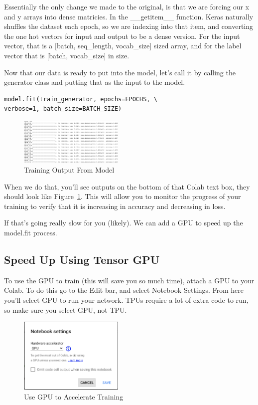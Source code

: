 \documentclass{article}
\begin{document}
Essentially the only change we made to the original, is that we are forcing our x and y arrays into dense matricies. In the \_\_getitem\_\_ function. Keras naturally shuffles the dataset each epoch, so we are indexing into that item, and converting the one hot vectors for input and output to be a dense version. For the input vector, that is a [batch, seq\_length, vocab\_size] sized array, and for the label vector that is [batch, vocab\_size] in size.

Now that our data is ready to put into the model, let's call it by calling the generator class and putting that as the input to the model. 

\begin{verbatim}
model.fit(train_generator, epochs=EPOCHS, \
verbose=1, batch_size=BATCH_SIZE)
\end{verbatim}

\begin{figure}[h!]
\centering
\includegraphics[width=50mm]{TrainingOutput.png}
\caption{Training Output From Model}
\label{fig:train}
\end{figure}

When we do that, you'll see outputs on the bottom of that Colab text box, they should look like Figure~\ref{fig:train}. This will allow you to monitor the progress of your training to verify that it is increasing in accuracy and decreasing in loss. 

If that's going really slow for you (likely). We can add a GPU to speed up the model.fit process.

 \subsection{Speed Up Using Tensor GPU}
 
 To use the GPU to train (this will save you so much time), attach a GPU to your Colab. To do this go to the Edit bar, and select Notebook Settings. From here you'll select GPU to run your network. TPUs require a lot of extra code to run, so make sure you select GPU, not TPU.
 
\begin{figure}[h!]
\centering
\includegraphics[width=50mm]{GPUAccel.png}
\caption{Use GPU to Accelerate Training}
\label{fig:gpu}
\end{figure}
 
\end{document}
